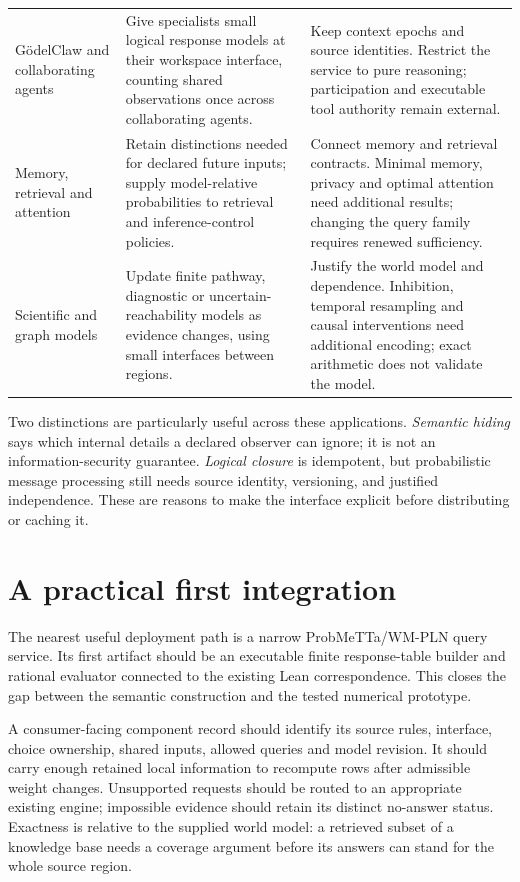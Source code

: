 \documentclass[11pt,a4paper]{article}
\begin{document}
\begin{longtable}{@{}P{.18\textwidth}P{.37\textwidth}P{.37\textwidth}@{}}
\\[5pt]
G\"odelClaw and collaborating agents &
Give specialists small logical response models at their workspace interface,
counting shared observations once across collaborating agents. &
Keep context epochs and source identities. Restrict the service to pure
reasoning; participation and executable tool authority remain external.
\\[5pt]
Memory, retrieval and attention &
Retain distinctions needed for declared future inputs; supply model-relative
probabilities to retrieval and inference-control policies. &
Connect memory and retrieval contracts. Minimal memory, privacy and optimal
attention need additional results; changing the query family requires renewed
sufficiency.
\\[5pt]
Scientific and graph models &
Update finite pathway, diagnostic or uncertain-reachability models as evidence
changes, using small interfaces between regions. &
Justify the world model and dependence. Inhibition, temporal resampling and
causal interventions need additional encoding; exact arithmetic does not
validate the model.
\\
\end{longtable}
\endgroup

Two distinctions are particularly useful across these applications.
\emph{Semantic hiding} says which internal details a declared observer can
ignore; it is not an information-security guarantee. \emph{Logical closure}
is idempotent, but probabilistic message processing still needs source identity,
versioning, and justified independence. These are reasons to make the interface
explicit before distributing or caching it.

\section{A practical first integration}

The nearest useful deployment path is a narrow ProbMeTTa/WM-PLN query service.
Its first artifact should be an executable finite response-table builder and
rational evaluator connected to the existing Lean correspondence. This closes
the gap between the semantic construction and the tested numerical prototype.

A consumer-facing component record should identify its source rules, interface,
choice ownership, shared inputs, allowed queries and model revision. It should
carry enough retained local information to recompute rows after admissible
weight changes. Unsupported requests should be routed to an appropriate
existing engine; impossible evidence should retain its distinct no-answer
status. Exactness is relative to the supplied world model: a retrieved subset
of a knowledge base needs a coverage argument before its answers can stand for
the whole source region.
\end{document}
